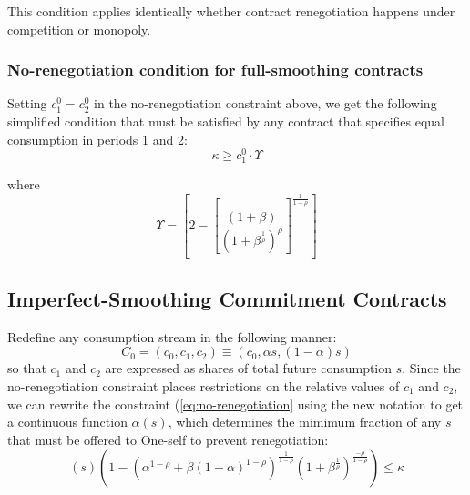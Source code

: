 \documentclass[11pt,english]{article}
\theoremstyle{plain}
\theoremstyle{definition}
\begin{document}
This condition applies identically whether contract renegotiation
happens under competition or monopoly.

\subsubsection{No-renegotiation condition for full-smoothing contracts}

Setting $c_{1}^{0}=c_{2}^{0}$ in the no-renegotiation constraint
above, we get the following simplified condition that must be satisfied
by any contract that specifies equal consumption in periods 1 and
2:
\begin{equation}
\kappa\geq c_{1}^{0}\cdotp\Upsilon\label{eq:smoothing-no-renegotiation}
\end{equation}

where
\begin{equation}
\Upsilon=\left[2-\left[\frac{(1+\beta)}{\left(1+\beta^{\frac{1}{\rho}}\right)^{\rho}}\right]^{\frac{1}{1-\rho}}\right]\label{eq:upsilon}
\end{equation}

\subsection{Imperfect-Smoothing Commitment Contracts}

Redefine any consumption stream in the following manner:
\begin{equation}
C_{0}=\left(c_{0},c_{1},c_{2}\right)\equiv\left(c_{0},\alpha s,\left(1-\alpha\right)s\right)\label{eq:new-notation}
\end{equation}
so that $c_{1}$ and $c_{2}$ are expressed as shares of total future
consumption $s$. Since the no-renegotiation constraint places restrictions
on the relative values of $c_{1}$ and $c_{2}$, we can rewrite the
constraint (\ref{eq:no-renegotiation} using the new notation to get
a continuous function $\alpha\left(s\right)$, which determines the
mimimum fraction of any $s$ that must be offered to One-self to prevent
renegotiation:
\begin{equation}
\left(s\right)\left(1-\left(\alpha^{1-\rho}+\beta\left(1-\alpha\right)^{1-\rho}\right)^{\frac{1}{1-\rho}}\left(1+\beta^{\frac{1}{\rho}}\right)^{\frac{-\rho}{1-\rho}}\right)\leq\kappa\label{eq:no-renegotiation-alpha-s}
\end{equation}
\end{document}

